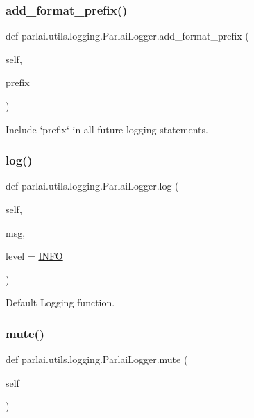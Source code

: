 \subsubsection{\texorpdfstring{add\+\_\+format\+\_\+prefix()}{add\_format\_prefix()}}
{\footnotesize\ttfamily def parlai.\+utils.\+logging.\+Parlai\+Logger.\+add\+\_\+format\+\_\+prefix (\begin{DoxyParamCaption}\item[{}]{self,  }\item[{}]{prefix }\end{DoxyParamCaption})}

\begin{DoxyVerb}Include `prefix` in all future logging statements.
\end{DoxyVerb}
 \mbox{\label{classparlai_1_1utils_1_1logging_1_1ParlaiLogger_aa545862a0e5c55d67989cc8ea7d545a1}} 
\subsubsection{\texorpdfstring{log()}{log()}}
{\footnotesize\ttfamily def parlai.\+utils.\+logging.\+Parlai\+Logger.\+log (\begin{DoxyParamCaption}\item[{}]{self,  }\item[{}]{msg,  }\item[{}]{level = {\ttfamily \hyperlink{namespaceparlai_1_1utils_1_1logging_a4bc2de74317465e5d1a8b5d7b913d48a}{I\+N\+FO}} }\end{DoxyParamCaption})}

\begin{DoxyVerb}Default Logging function.
\end{DoxyVerb}
 \mbox{\label{classparlai_1_1utils_1_1logging_1_1ParlaiLogger_a560f0cf26c3eaae2d785c4f35cae2c4b}} 
\subsubsection{\texorpdfstring{mute()}{mute()}}
{\footnotesize\ttfamily def parlai.\+utils.\+logging.\+Parlai\+Logger.\+mute (\begin{DoxyParamCaption}\item[{}]{self }\end{DoxyParamCaption})}

